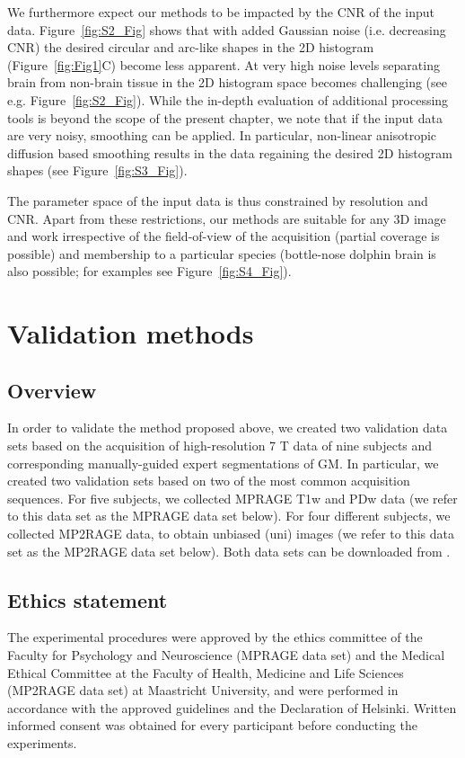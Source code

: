 We furthermore expect our methods to be impacted by the CNR of the input data. Figure~\ref{fig:S2_Fig} shows that with added Gaussian noise (i.e. decreasing CNR) the desired circular and arc-like shapes in the 2D histogram (Figure~\ref{fig:Fig1}C) become less apparent. At very high noise levels separating brain from non-brain tissue in the 2D histogram space becomes challenging (see e.g. Figure~\ref{fig:S2_Fig}). While the in-depth evaluation of additional processing tools is beyond the scope of the present chapter, we note that if the input data are very noisy, smoothing can be applied. In particular, non-linear anisotropic diffusion based smoothing \parencite{Weickert1998, Mirebeau2015} results in the data regaining the desired 2D histogram shapes (see Figure~\ref{fig:S3_Fig}).

The parameter space of the input data is thus constrained by resolution and CNR. Apart from these restrictions, our methods are suitable for any 3D image and work irrespective of the field-of-view of the acquisition (partial coverage is possible) and membership to a particular species (bottle-nose dolphin brain is also possible; for examples see Figure~\ref{fig:S4_Fig}).

\section{Validation methods}
\label{sec:ValidationMethods}
\subsection{Overview}
In order to validate the method proposed above, we created two validation data sets based on the acquisition of high-resolution 7 T data of nine subjects and corresponding manually-guided expert segmentations of GM. In particular, we created two validation sets based on two of the most common acquisition sequences. For five subjects, we collected MPRAGE T1w and PDw data (we refer to this data set as the MPRAGE data set below). For four different subjects, we collected MP2RAGE data, to obtain unbiased (uni) images (we refer to this data set as the MP2RAGE data set below). Both data sets can be downloaded from \cite{shared_dataset}.

\subsection{Ethics statement}
The experimental procedures were approved by the ethics committee of the Faculty for Psychology and Neuroscience (MPRAGE data set) and the Medical Ethical Committee at the Faculty of Health, Medicine and Life Sciences (MP2RAGE data set) at Maastricht University, and were performed in accordance with the approved guidelines and the Declaration of Helsinki. Written informed consent was obtained for every participant before conducting the experiments.

